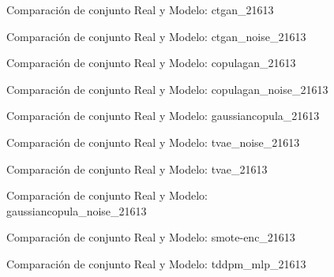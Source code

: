 \begin{figure}[H]
    \centering
    
    \caption{Comparación de conjunto Real y Modelo: ctgan\_21613}
    \label{pair-ctgan_21613}
\end{figure}
\begin{figure}[H]
    \centering
    
    \caption{Comparación de conjunto Real y Modelo: ctgan\_noise\_21613}
    \label{pair-ctgan_noise_21613}
\end{figure}
\begin{figure}[H]
    \centering
    
    \caption{Comparación de conjunto Real y Modelo: copulagan\_21613}
    \label{pair-copulagan_21613}
\end{figure}
\begin{figure}[H]
    \centering
    
    \caption{Comparación de conjunto Real y Modelo: copulagan\_noise\_21613}
    \label{pair-copulagan_noise_21613}
\end{figure}
\begin{figure}[H]
    \centering
    
    \caption{Comparación de conjunto Real y Modelo: gaussiancopula\_21613}
    \label{pair-gaussiancopula_21613}
\end{figure}
\begin{figure}[H]
    \centering
    
    \caption{Comparación de conjunto Real y Modelo: tvae\_noise\_21613}
    \label{pair-tvae_noise_21613}
\end{figure}
\begin{figure}[H]
    \centering
    
    \caption{Comparación de conjunto Real y Modelo: tvae\_21613}
    \label{pair-tvae_21613}
\end{figure}
\begin{figure}[H]
    \centering
    
    \caption{Comparación de conjunto Real y Modelo: gaussiancopula\_noise\_21613}
    \label{pair-gaussiancopula_noise_21613}
\end{figure}
\begin{figure}[H]
    \centering
    
    \caption{Comparación de conjunto Real y Modelo: smote-enc\_21613}
    \label{pair-smote-enc_21613}
\end{figure}
\begin{figure}[H]
    \centering
    
    \caption{Comparación de conjunto Real y Modelo: tddpm\_mlp\_21613}
    \label{pair-tddpm_mlp_21613}
\end{figure}

